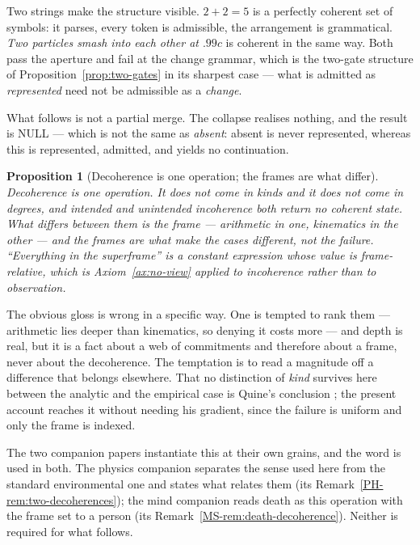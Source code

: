 \documentclass[11pt,a4paper]{article}
\newtheorem{proposition}[definition]{Proposition}
\theoremstyle{remark}\newtheorem{remark}[definition]{Remark}
\begin{document}
Two strings make the structure visible. \emph{$2+2=5$} is a perfectly coherent set of symbols: it
parses, every token is admissible, the arrangement is grammatical. \emph{Two particles smash into each
other at $.99c$} is coherent in the same way. Both pass the aperture and fail at the change grammar,
which is the two-gate structure of Proposition~\ref{prop:two-gates} in its sharpest case --- what is
admitted as \emph{represented} need not be admissible as a \emph{change}.

What follows is not a partial merge. The collapse realises nothing, and the result is NULL --- which is
not the same as \emph{absent}: absent is never represented, whereas this is represented, admitted, and
yields no continuation.

\begin{proposition}[Decoherence is one operation; the frames are what differ]\label{prop:decoherence-one}
Decoherence is one operation. It does not come in kinds and it
does not come in degrees, and intended and unintended incoherence both return no coherent state. What differs between them is the
frame --- arithmetic in one, kinematics in the other --- and \emph{the frames are what make the cases
different, not the failure}. ``Everything in the superframe'' is a constant expression whose value is
frame-relative, which is Axiom~\ref{ax:no-view} applied to incoherence rather than to observation.
\end{proposition}

The obvious gloss is wrong in a specific way. One is tempted to rank
them --- arithmetic lies deeper than kinematics, so denying it costs more --- and depth is real, but it
is a fact about a web of commitments and therefore about a frame, never about the decoherence. The
temptation is to read a magnitude off a difference that belongs elsewhere. That no distinction of
\emph{kind} survives here between the analytic and the empirical case is Quine's conclusion
\citep{quine1951}; the present account reaches it without needing his gradient, since the failure is
uniform and only the frame is indexed.

The two companion papers instantiate this at their own grains, and the word is used in both. The
physics companion separates the sense used here from the standard environmental one and states what
relates them (its Remark~\ref{PH-rem:two-decoherences}); the mind companion reads death as this operation with the frame set to a person (its Remark~\ref{MS-rem:death-decoherence}).
Neither is required for what follows.
\end{document}
